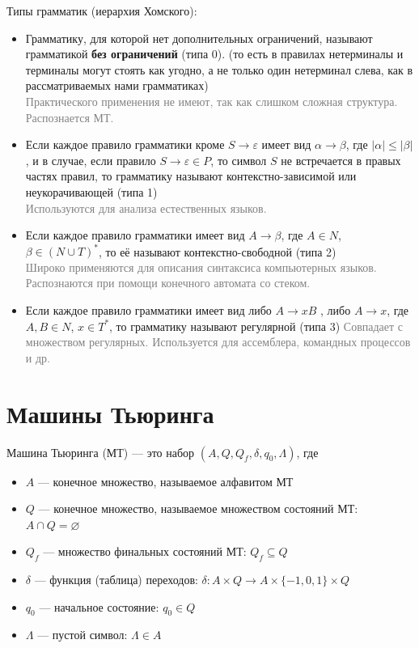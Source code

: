 \documentclass[11pt]{article}
\begin{document}
\begin{definition}
    Типы грамматик (иерархия Хомского):
    \begin{itemize}
        \item Грамматику, для которой нет дополнительных ограничений, называют грамматикой \textbf{без ограничений} (типа 0). (то есть в правилах нетерминалы и терминалы 
        могут стоять как угодно, а не только один нетерминал слева, как в рассматриваемых нами грамматиках)\\ 
        \textcolor{gray}{Практического применения не имеют, так как слишком сложная структура. Распознается МТ.}
        \item Если каждое правило грамматики кроме $S \to \varepsilon$ имеет вид $\alpha \to \beta$, где $|\alpha| \leq |\beta|$, и в случае, если правило $S \to \varepsilon \in P$, 
        то символ $S$ не встречается в правых частях правил, то грамматику называют контекстно-зависимой или неукорачивающей (типа 1)\\
        \textcolor{gray}{Используются для анализа естественных языков.}
        \item Если каждое правило грамматики имеет вид $A \to \beta$, где $A \in N$, $\beta \in (N \cup T)^*$, то её называют контекстно-свободной (типа 2)\\
        \textcolor{gray}{Широко применяются для описания синтаксиса компьютерных языков. Распознаются при помощи конечного автомата со стеком.}
        \item Если каждое правило грамматики имеет вид либо $A \to xB$ , либо $A \to x$, где $A, B \in N$, $x \in T^*$, то грамматику называют регулярной (типа 3)
        \textcolor{gray}{Совпадает с множеством регулярных. Используется для ассемблера, командных процессов и др.}
    \end{itemize}
\end{definition}


\section{Машины Тьюринга}

\begin{definition}
    Машина Тьюринга (МТ) — это набор $(A, Q, Q_f, \delta, q_0, \Lambda)$, где 
    \begin{itemize}
        \item $A$ --- конечное множество, называемое алфавитом МТ
        \item $Q$ --- конечное множество, называемое множеством состояний МТ: $A \cap Q = \varnothing$
        \item $Q_f$ --- множество финальных состояний МТ: $Q_f \subseteq Q$
        \item $\delta$ — функция (таблица) переходов: $\delta: A \times Q \to A \times \{-1, 0, 1\} \times Q$
        \item $q_0$ --- начальное состояние: $q_0 \in Q$
        \item $\Lambda$ --- пустой символ: $\Lambda \in A$
    \end{itemize}
\end{definition}
\end{document}
